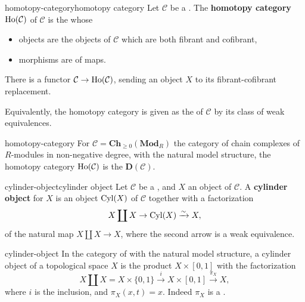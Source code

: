 \begin{topic}{homotopy-category}{homotopy category}
    Let $\mathcal{C}$ be a . The \textbf{homotopy category} $\textup{Ho}(\mathcal{C})$ of $\mathcal{C}$ is the  whose
    \begin{itemize}
        \item objects are the objects of $\mathcal{C}$ which are both fibrant and cofibrant,
        \item morphisms are  of maps.
    \end{itemize}
    There is a functor $\mathcal{C} \to \textup{Ho}(\mathcal{C})$, sending an object $X$ to its fibrant-cofibrant replacement.
    
    Equivalently, the homotopy category is given as the  of $\mathcal{C}$ by its class of weak equivalences.
\end{topic}

\begin{example}{homotopy-category}
    For $\mathcal{C} = \textbf{Ch}_{\ge 0}(\textbf{Mod}_R)$ the category of chain complexes of $R$-modules in non-negative degree, with the natural model structure, the homotopy category $\textup{Ho}(\mathcal{C})$ is the  $\textbf{D}(\mathcal{C})$.
\end{example}

\begin{topic}{cylinder-object}{cylinder object}
    Let $\mathcal{C}$ be a , and $X$ an object of $\mathcal{C}$. A \textbf{cylinder object} for $X$ is an object $\textup{Cyl}(X)$ of $\mathcal{C}$ together with a factorization
    \[ X \coprod X \to \textup{Cyl}(X) \xrightarrow{\sim} X , \]
    of the natural map $X \coprod X \to X$, where the second arrow is a weak equivalence.
\end{topic}

\begin{example}{cylinder-object}
    In the category of  with the natural model structure, a cylinder object of a topological space $X$ is the product $X \times [0, 1]$ with the factorization
    \[ X \coprod X = X \times \{ 0, 1 \} \xrightarrow{i} X \times [0, 1] \xrightarrow{\pi_X} X , \]
    where $i$ is the inclusion, and $\pi_X(x, t) = x$. Indeed $\pi_X$ is a .
\end{example}

